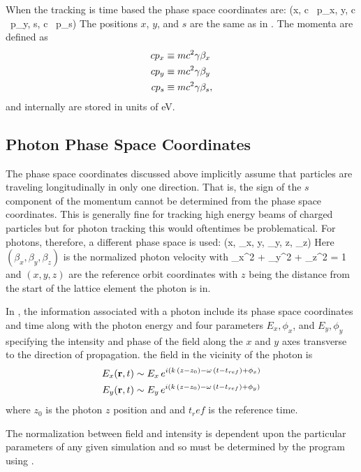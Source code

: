 When the tracking is time based the phase space coordinates are:
\Begineq
  (x, c \, p_x, y, c \, p_y, s, c \, p_s)
\Endeq
The positions $x$, $y$, and $s$ are the same as in
. The momenta are defined as
\begin{align}
c p_x &\equiv m c^2 \gamma \beta_x \nonumber \\
c p_y &\equiv m c^2 \gamma \beta_y \\
c p_s &\equiv m c^2 \gamma \beta_s, \nonumber
\end{align}
and internally are stored in units of eV.

\subsection{Photon Phase Space Coordinates}
\label{s:photon.phase.space}

The phase space coordinates discussed above implicitly assume that
particles are traveling longitudinally in only one direction. That is,
the sign of the $s$ component of the momentum cannot be determined
from the phase space coordinates. This is generally fine for tracking
high energy beams of charged particles but for photon tracking this
would oftentimes be problematical. For photons, therefore, a different
phase space is used:
\Begineq
  (x, \beta_x, y, \beta_y, z, \beta_z)
  \label{xbybzb}
\Endeq
Here $(\beta_x, \beta_y, \beta_z)$ is the normalized photon velocity with
\Begineq
  \beta_x^2 + \beta_y^2 + \beta_z^2 = 1 
  \label{bbb1}
\Endeq
and $(x, y, z)$ are the reference orbit coordinates with $z$ being the
distance from the start of the lattice element the photon is in.

In \bmad, the information associated with a photon include its phase
space coordinates and time along with the photon energy and four
parameters $E_x, \phi_x$, and $E_y, \phi_y$ specifying the intensity
and phase of the field along the $x$ and $y$ axes transverse to the
direction of propagation.  the field in the vicinity of the photon is
\begin{align}
  E_x ({\bf r}, t) &\sim E_x \, e^{i (k \, (z - z_0) - \omega \, (t - t_{ref}) + \phi_x)} \nonumber \\
  E_y ({\bf r}, t) &\sim E_y \, e^{i (k \, (z - z_0) - \omega \, (t - t_{ref}) + \phi_y)} 
  \label{ertee}
\end{align}
where $z_0$ is the photon $z$ position and and $t_ref$ is the reference time.

The normalization between field and intensity is dependent upon the
particular parameters of any given simulation and so must be
determined by the program using \bmad.

